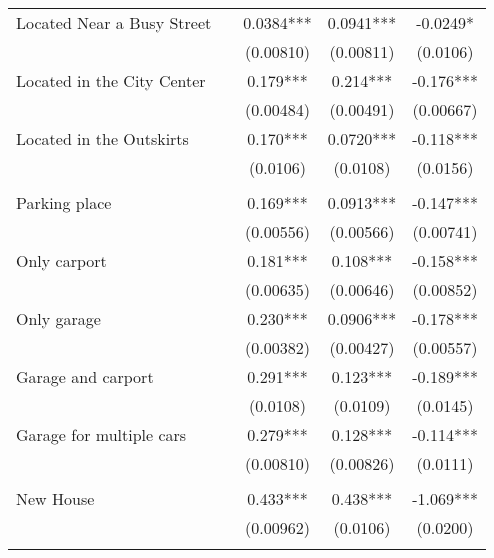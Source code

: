 \documentclass[12pt]{article}
\begin{document}
\begin{table}[H]
\begin{tabular}{lcccc}
Located Near a Busy Street      &            & 0.0384***   & 0.0941***   & -0.0249*     \\
                                &            & (0.00810)   & (0.00811)   & (0.0106)     \\
Located in the City Center      &            & 0.179***    & 0.214***    & -0.176***    \\
                                &            & (0.00484)   & (0.00491)   & (0.00667)    \\
Located in the Outskirts        &            & 0.170***    & 0.0720***   & -0.118***    \\
                                &            & (0.0106)    & (0.0108)    & (0.0156)     \\
      &            &             &             &              \\
Parking place                   &            & 0.169***    & 0.0913***   & -0.147***    \\
                                &            & (0.00556)   & (0.00566)   & (0.00741)    \\
Only carport                    &            & 0.181***    & 0.108***    & -0.158***    \\
                                &            & (0.00635)   & (0.00646)   & (0.00852)    \\
Only garage                     &            & 0.230***    & 0.0906***   & -0.178***    \\
                                &            & (0.00382)   & (0.00427)   & (0.00557)    \\
Garage and carport              &            & 0.291***    & 0.123***    & -0.189***    \\
                                &            & (0.0108)    & (0.0109)    & (0.0145)     \\
Garage for multiple cars        &            & 0.279***    & 0.128***    & -0.114***    \\
                                &            & (0.00810)   & (0.00826)   & (0.0111)     \\
      &            &             &             &              \\
New House                       &            & 0.433***    & 0.438***    & -1.069***    \\
                                &            & (0.00962)   & (0.0106)    & (0.0200)     \\
                         &            &             &             &              \\

\end{tabular}
\end{table}
\end{document}
